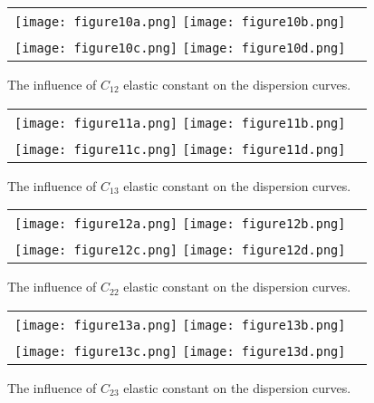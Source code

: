 \documentclass[]{spie}  %
\begin{document}
\begin{figure} [ht]
	\begin{center}
		\begin{tabular}{cc} %
			\texttt{[image: figure10a.png]}
			\texttt{[image: figure10b.png]}\\
			\texttt{[image: figure10c.png]}
			\texttt{[image: figure10d.png]}
		\end{tabular}
	\end{center}
	\caption[] 
	{ \label{fig:C12} 
		The influence of \(C_{12}\) elastic constant on the dispersion curves.}
\end{figure} 

\begin{figure} [ht]
	\begin{center}
		\begin{tabular}{cc} %
			\texttt{[image: figure11a.png]}
			\texttt{[image: figure11b.png]}\\
			\texttt{[image: figure11c.png]}
			\texttt{[image: figure11d.png]}
		\end{tabular}
	\end{center}
	\caption[] 
	{ \label{fig:C13} 
		The influence of \(C_{13}\) elastic constant on the dispersion curves.}
\end{figure} 

\begin{figure} [ht]
	\begin{center}
		\begin{tabular}{cc} %
			\texttt{[image: figure12a.png]}
			\texttt{[image: figure12b.png]}\\
			\texttt{[image: figure12c.png]}
			\texttt{[image: figure12d.png]}
		\end{tabular}
	\end{center}
	\caption[] 
	{ \label{fig:C22} 
		The influence of \(C_{22}\) elastic constant on the dispersion curves.}
\end{figure} 

\begin{figure} [ht]
	\begin{center}
		\begin{tabular}{cc} %
			\texttt{[image: figure13a.png]}
			\texttt{[image: figure13b.png]}\\
			\texttt{[image: figure13c.png]}
			\texttt{[image: figure13d.png]}
		\end{tabular}
	\end{center}
	\caption[] 
	{ \label{fig:C23} 
		The influence of \(C_{23}\) elastic constant on the dispersion curves.}
\end{figure} 
\end{document}
